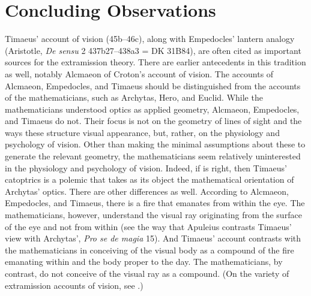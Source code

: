 
\section{Concluding Observations} %
\label{sec:concluding_observations_v_a}

Timaeus' account of vision (45b–46c), along with Empedocles' lantern analogy (Aristotle, \emph{De sensu} 2 437b27–438a3 = DK 31B84), are often cited as important sources for the extramission theory. There are earlier antecedents in this tradition as well, notably Alcmaeon of Croton's account of vision. The accounts of Alcmaeon, Empedocles, and Timaeus should be distinguished from the accounts of the mathematicians, such as Archytas, Hero, and Euclid. While the mathematicians understood optics as applied geometry, Alcmaeon, Empedocles, and Timaeus do not. Their focus is not on the geometry of lines of sight and the ways these structure visual appearance, but, rather, on the physiology and psychology of vision. Other than making the minimal assumptions about these to generate the relevant geometry, the mathematicians seem relatively uninterested in the physiology and psychology of vision. Indeed, if \citet{Burnyeat:2005rc} is right, then Timaeus' catoptrics is a polemic that takes as its object the mathematical orientation of Archytas' optics. There are other differences as well. According to Alcmaeon, Empedocles, and Timaeus, there is a fire that emanates from within the eye. The mathematicians, however, understand the visual ray originating from the surface of the eye and not from within (see the way that Apuleius contrasts Timaeus' view with Archytas', \emph{Pro se de magia} 15). And Timaeus' account contrasts with the mathematicians in conceiving of the visual body as a compound of the fire emanating within and the body proper to the day. The mathematicians, by contrast, do not conceive of the visual ray as a compound. (On the variety of extramission accounts of vision, see \citealt{Lindberg:1978lq}.)

